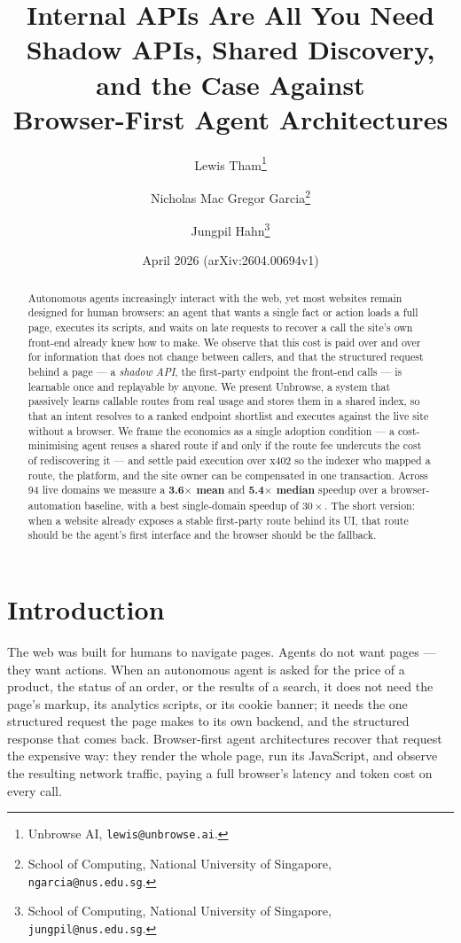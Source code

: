 \documentclass[11pt]{article}
\title{\textbf{Internal APIs Are All You Need}\\
\large Shadow APIs, Shared Discovery, and the Case Against\\
Browser-First Agent Architectures}
\author{Lewis Tham\thanks{Unbrowse AI, \texttt{lewis@unbrowse.ai}.}
  \and Nicholas Mac Gregor Garcia\thanks{School of Computing, National University
  of Singapore, \texttt{ngarcia@nus.edu.sg}.}
  \and Jungpil Hahn\thanks{School of Computing, National University of Singapore,
  \texttt{jungpil@nus.edu.sg}.}}
\date{April 2026 \quad(arXiv:2604.00694v1)}
\begin{document}
\maketitle

\begin{abstract}
Autonomous agents increasingly interact with the web, yet most websites remain
designed for human browsers: an agent that wants a single fact or action loads a
full page, executes its scripts, and waits on late requests to recover a call the
site's own front-end already knew how to make. We observe that this cost is paid
over and over for information that does not change between callers, and that the
structured request behind a page --- a \emph{shadow API}, the first-party endpoint
the front-end calls --- is learnable once and replayable by anyone. We present
Unbrowse, a system that passively learns callable routes from real usage and stores
them in a shared index, so that an intent resolves to a ranked endpoint shortlist
and executes against the live site without a browser. We frame the economics as a
single adoption condition --- a cost-minimising agent reuses a shared route if and
only if the route fee undercuts the cost of rediscovering it --- and settle paid
execution over x402 so the indexer who mapped a route, the platform, and the site
owner can be compensated in one transaction. Across 94 live domains we measure a
\textbf{3.6$\times$ mean} and \textbf{5.4$\times$ median} speedup over a
browser-automation baseline, with a best single-domain speedup of $30\times$. The
short version: when a website already exposes a stable first-party route behind
its UI, that route should be the agent's first interface and the browser should be
the fallback.
\end{abstract}

\section{Introduction}
The web was built for humans to navigate pages. Agents do not want pages --- they
want actions. When an autonomous agent is asked for the price of a product, the
status of an order, or the results of a search, it does not need the page's markup,
its analytics scripts, or its cookie banner; it needs the one structured request
the page makes to its own backend, and the structured response that comes back.
Browser-first agent architectures recover that request the expensive way: they
render the whole page, run its JavaScript, and observe the resulting network
traffic, paying a full browser's latency and token cost on every call.
\end{document}
